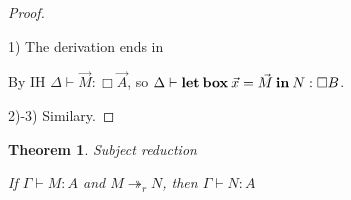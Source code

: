 \documentclass[a4paper]{article}
\newtheorem{theorem}{Theorem}
\begin{document}
\begin{proof}
  $ $

1) The derivation ends in

\begin{prooftree}
\end{prooftree}

By IH $\Delta \vdash \vec{M} : \Box \vec{A}$, so $\Delta \vdash {\bf let \: box \:} \vec{x} = \vec{M} {\: \bf in \: } N : \Box B$.

  \vspace{\baselineskip}

2)-3) Similary.

\end{proof}

\begin{theorem} Subject reduction

  If $\Gamma \vdash M : A$ and $M \twoheadrightarrow_r N$, then $\Gamma \vdash N : A$

\end{theorem}
\end{document}
